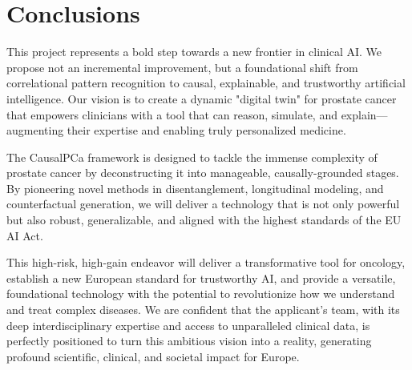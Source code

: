 \documentclass[11pt, a4paper]{article}
\begin{document}
\section{Conclusions}
This project represents a bold step towards a new frontier in clinical AI. We propose not an incremental improvement, but a foundational shift from correlational pattern recognition to causal, explainable, and trustworthy artificial intelligence. Our vision is to create a dynamic "digital twin" for prostate cancer that empowers clinicians with a tool that can reason, simulate, and explain—augmenting their expertise and enabling truly personalized medicine.

The CausalPCa framework is designed to tackle the immense complexity of prostate cancer by deconstructing it into manageable, causally-grounded stages. By pioneering novel methods in disentanglement, longitudinal modeling, and counterfactual generation, we will deliver a technology that is not only powerful but also robust, generalizable, and aligned with the highest standards of the EU AI Act.

This high-risk, high-gain endeavor will deliver a transformative tool for oncology, establish a new European standard for trustworthy AI, and provide a versatile, foundational technology with the potential to revolutionize how we understand and treat complex diseases. We are confident that the applicant's team, with its deep interdisciplinary expertise and access to unparalleled clinical data, is perfectly positioned to turn this ambitious vision into a reality, generating profound scientific, clinical, and societal impact for Europe.



\end{document}
